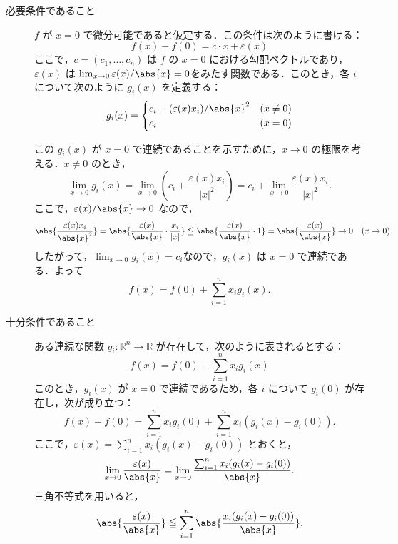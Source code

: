 



\begin{tproof}
  \begin{description}
    \item[必要条件であること]
          $ f $ が $ x=0 $ で微分可能であると仮定する．この条件は次のように書ける：
          \[
            f(x) - f(0) = c \cdot x + \varepsilon(x)
          \]
          ここで，$ c = (c_1, \ldots, c_n) $ は $ f $ の $ x=0 $ における勾配ベクトルであり，$ \varepsilon(x) $ は
          $\lim_{x \to 0} \varepsilon(x)/\abs{x} = 0$をみたす関数である．このとき，各 $ i $ について次のように $ g_i(x) $ を定義する：
          \[
            g_i(x) =
            \begin{cases}
              c_i + (\varepsilon(x) x_i)/\abs{x}^2 & (x \ne 0) \\
              c_i                                  & (x = 0)
            \end{cases}
          \]

          この $ g_i(x) $ が $ x=0 $ で連続であることを示すために，$ x \to 0 $ の極限を考える．$ x \ne 0 $ のとき，
          \[
            \lim_{x \to 0} g_i(x) = \lim_{x \to 0} \left( c_i + \frac{\varepsilon(x) x_i}{|x|^2} \right) = c_i + \lim_{x \to 0} \frac{\varepsilon(x) x_i}{|x|^2}.
          \]
          ここで，$\varepsilon(x)/\abs{x} \to 0 $ なので，
          \[
            \abs{\frac{\varepsilon(x) x_i}{\abs{x}^2}} = \abs{\frac{\varepsilon(x)}{\abs{x}} \cdot \frac{x_i}{|x|}} \leqq  \abs{\frac{\varepsilon(x)}{\abs{x}} \cdot 1} = \abs{\frac{\varepsilon(x)}{\abs{x}}} \to 0 \quad (x \to 0).
          \]
          したがって，$\lim_{x \to 0} g_i(x) = c_i$なので，$ g_i(x) $ は $ x=0 $ で連続である．よって
          \[
            f(x) = f(0) + \sum_{i=1}^n x_i g_i(x).
          \]
    \item [十分条件であること]
          ある連続な関数 $ g_i \colon \mathbb{R}^n \to \mathbb{R} $ が存在して，次のように表されるとする：
          \[
            f(x) = f(0) + \sum_{i=1}^n x_i g_i(x)
          \]
          このとき，$ g_i(x) $ が $ x=0 $ で連続であるため，各 $ i $ について $ g_i(0) $ が存在し，次が成り立つ：
          \[
            f(x) - f(0) = \sum_{i=1}^n x_i g_i(0) + \sum_{i=1}^n x_i (g_i(x) - g_i(0)).
          \]
          ここで，$ \varepsilon(x) = \sum_{i=1}^n x_i (g_i(x) - g_i(0)) $ とおくと，
          \[
            \lim_{x \to 0} \frac{\varepsilon(x)}{\abs{x}} = \lim_{x \to 0} \frac{\sum_{i=1}^n x_i (g_i(x) - g_i(0))}{\abs{x}}.
          \]
          三角不等式を用いると，
          \[
            \abs{ \frac{\varepsilon(x)}{\abs{x}} } \leqq \sum_{i=1}^n \abs{ \frac{x_i(g_i(x) - g_i(0))}{\abs{x}} }.
          \]


\end{description}
\end{tproof}
